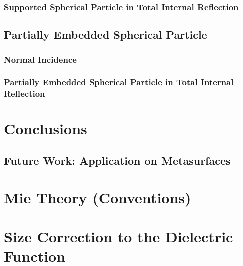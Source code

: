 \documentclass[11pt]{Latex/Classes/PhDthesisPSnPDF}
\begin{document}
         \subsection{Supported Spherical Particle in Total Internal Reflection}
         \label{s:TIR}
         

    \section{Partially Embedded Spherical Particle}
    \label{s:Emb}
       

       \subsection{Normal Incidence}
       
         \label{s:Emb:Normal}

        \subsection{Partially Embedded Spherical Particle in Total Internal Reflection}
        
         \label{s:Emb:Obl}

\chapter*{Conclusions}
	\label{ch:Conclusions}
		
	
    \section*{Future Work: Application on Metasurfaces}
    \label{s:FWork}
    	

\appendix

\chapter{Mie Theory (Conventions)}
  \label{app:MieCode}
  

\chapter{Size Correction to the Dielectric Function}
    \label{app:SizeCorrection}
    
\end{document}
